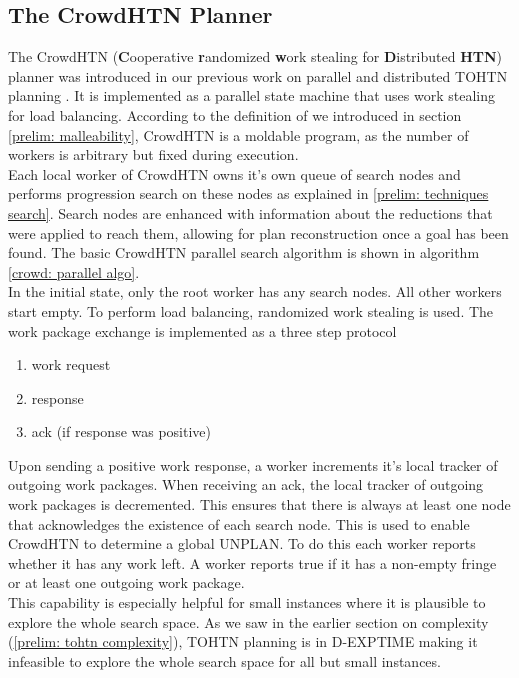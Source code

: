 \subsection{The CrowdHTN Planner}
\label{prelim: crowdhtn}
The CrowdHTN (\textbf{C}ooperative \textbf{r}andomized \textbf{w}ork stealing for \textbf{D}istributed \textbf{HTN}) planner was introduced in our previous work on parallel and distributed TOHTN planning \cite{bretl2021parallel}. It is implemented as a parallel state machine that uses work stealing for load balancing. According to the definition of \cite{feitelson1997job} we introduced in section \ref{prelim: malleability}, CrowdHTN is a moldable program, as the number of workers is arbitrary but fixed during execution. \\
Each local worker of CrowdHTN owns it's own queue of search nodes and performs progression search on these nodes as explained in \ref{prelim: techniques search}. Search nodes are enhanced with information about the reductions that were applied to reach them, allowing for plan reconstruction once a goal has been found. The basic CrowdHTN parallel search algorithm is shown in algorithm \ref{crowd: parallel algo}. \\
In the initial state, only the root worker has any search nodes. All other workers start empty. To perform load balancing, randomized work stealing is used. The work package exchange is implemented as a three step protocol
\begin{enumerate}
	\item work request
	\item response
	\item ack (if response was positive)
\end{enumerate}
Upon sending a positive work response, a worker increments it's local tracker of outgoing work packages. When receiving an ack, the local tracker of outgoing work packages is decremented. This ensures that there is always at least one node that acknowledges the existence of each search node. This is used to enable CrowdHTN to determine a global UNPLAN. To do this each worker reports whether it has any work left. A worker reports true if it has a non-empty fringe or at least one outgoing work package. \\
This capability is especially helpful for small instances where it is plausible to explore the whole search space. As we saw in the earlier section on complexity (\ref{prelim: tohtn complexity}), TOHTN planning is in D-EXPTIME making it infeasible to explore the whole search space for all but small instances.\\
